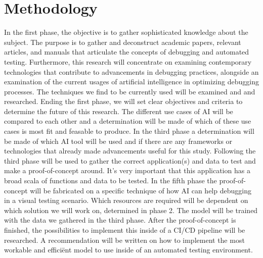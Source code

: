 \section{Methodology}%
\label{sec:methodology}
In the first phase, the objective is to gather sophisticated knowledge about the subject.
The purpose is to gather and deconstruct academic papers, relevant articles, and manuals that articulate the concepts of debugging and automated testing.
Furthermore, this research will concentrate on examining contemporary technologies that contribute to advancements in debugging practices, alongside an examination of the current usages of artificial intelligence in optimizing debugging processes.
The techniques we find to be currently used will be examined and and researched.
Ending the first phase, we will set clear objectives and criteria to determine the future of this research.
The different use cases of AI will be compared to each other and a determination will be made of which of these use cases is most fit and feasable to produce.
In the third phase a determination will be made of which AI tool will be used and if there are any frameworks or technologies that already made advancements useful for this study.
Following the third phase will be used to gather the correct application(s) and data to test and make a proof-of-concept around.
It's very important that this application has a broad scala of functions and data to be tested.
In the fifth phase the proof-of-concept will be fabricated on a specific technique of how AI can help debugging in a visual testing scenario.
Which resources are required will be dependent on which solution we will work on, determined in phase 2.
The model will be trained with the data we gathered in the third phase.
After the proof-of-concept is finished, the possibilities to implement this inside of a CI/CD pipeline will be researched.
A recommendation will be written on how to implement the most workable and efficiënt model to use inside of an automated testing environment.
